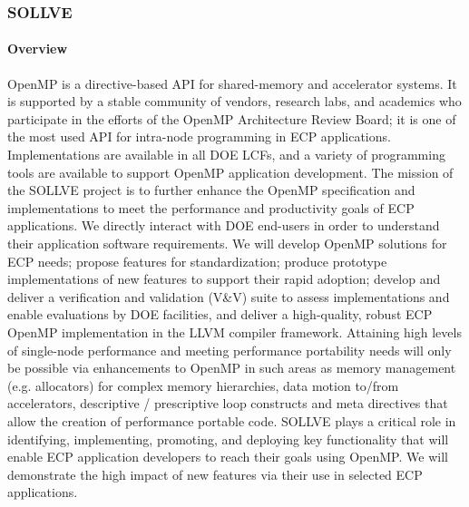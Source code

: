 \subsubsection{ SOLLVE} \label{subsubsect:sollve}


\paragraph{Overview} 

OpenMP is a   directive-based API for shared-memory and accelerator systems. It
is supported by a stable community of vendors, research labs, and academics who
participate in the efforts of the  OpenMP Architecture Review Board; it is
one of the most used API for intra-node programming in ECP applications.
Implementations are available in all DOE LCFs, and a variety of programming
tools are available to support OpenMP application development. The mission of
the SOLLVE project is to further enhance the OpenMP specification and
implementations to meet the performance and productivity goals of ECP
applications. We directly interact with DOE end-users in order to understand
their application software requirements. We will develop OpenMP solutions for
ECP needs; propose features for standardization; produce prototype
implementations of new features to support their rapid adoption; develop and
deliver a verification and validation (V\&V) suite to assess implementations and
enable evaluations by DOE  facilities, and deliver a high-quality,  robust ECP
OpenMP implementation in the LLVM compiler framework. Attaining high levels of
single-node performance and meeting performance portability needs will only be
possible via enhancements to OpenMP in such areas as memory management (e.g. allocators) for 
complex memory  hierarchies, data motion to/from accelerators, descriptive / prescriptive
loop constructs and meta directives that allow the creation of performance portable code. 
SOLLVE plays a critical
role in identifying, implementing, promoting, and deploying key functionality
that will enable ECP application developers to reach their goals using OpenMP.
We will demonstrate the high impact of new features via their use in selected
ECP applications.

